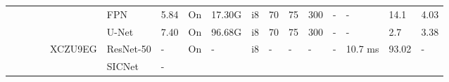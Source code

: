 \begin{table}
\begin{adjustbox}{totalheight=\baselineskip,}
\begin{tabular}{ccccclp{2em}cp{3em}cp{2em}p{4em}p{3em}p{3.5em}p{3.5em}p{2.5em}p{3em}}
   &   &   &   &   &\multirow{1}{*}{FPN}
                       &\multirow{1}{*}{5.84}
                           &\multirow{1}{*}{On}
                               &\multirow{1}{*}{17.30G}
                                   &\multirow{1}{*}{i8}
                                       &\multirow{1}{*}{70}
                                           &\multirow{1}{*}{75}
                                               &\multirow{1}{*}{300}
                                                   &\multirow{1}{*}{-}
                                                       &\multirow{1}{*}{-}
                                                           &\multirow{1}{*}{14.1}
                                                               &\multirow{1}{*}{4.03}\\
   &   &   &   &   &\multirow{1}{*}{U-Net}
                       &\multirow{1}{*}{7.40}
                           &\multirow{1}{*}{On}
                               &\multirow{1}{*}{96.68G}
                                   &\multirow{1}{*}{i8}
                                       &\multirow{1}{*}{70}
                                           &\multirow{1}{*}{75}
                                               &\multirow{1}{*}{300}
                                                   &\multirow{1}{*}{-}
                                                       &\multirow{1}{*}{-}
                                                           &\multirow{1}{*}{2.7}
                                                               &\multirow{1}{*}{3.38}\\
\cmidrule{4-17}
   &   &   &\multirow{2}{*}{\cite{upadhyayDesignImplementationCNNbased2024}}
               &\multirow{2}{*}{XCZU9EG}
                   &\multirow{1}{*}{ResNet-50}
                       &\multirow{1}{*}{-}
                           &\multirow{1}{*}{On}
                               &\multirow{1}{*}{-}
                                   &\multirow{1}{*}{i8}
                                       &\multirow{1}{*}{-}
                                           &\multirow{1}{*}{-}
                                               &\multirow{1}{*}{-}
                                                   &\multirow{1}{*}{-}
                                                       &\multirow{1}{*}{10.7 ms}
                                                           &\multirow{1}{*}{93.02}
                                                               &\multirow{1}{*}{-}\\
   &   &   &   &   &\multirow{1}{*}{SICNet}
                       &\multirow{1}{*}{-}

\end{tabular}
\end{adjustbox}
\end{table}
